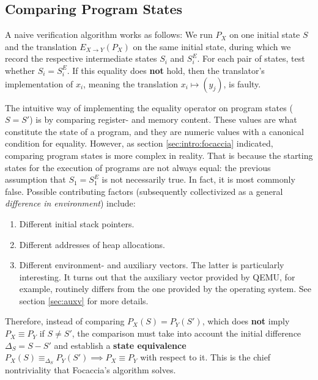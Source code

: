 \subsection{Comparing Program States}\label{sec:impl:comparison}

A naive verification algorithm works as follows: We run $P_X$ on one initial state $S$ and the translation $E_{X
\rightarrow Y}(P_X)$ on the same initial state, during which we record the respective intermediate states $S_i$ and
$S^E_i$. For each pair of states, test whether $S_i = S^E_i$. If this equality does \textbf{not} hold, then the
translator's implementation of $x_i$, meaning the translation $x_i \mapsto (y_j)$, is faulty.

The intuitive way of implementing the equality operator on program states ($S = S'$) is by comparing register- and
memory content. These values are what constitute the state of a program, and they are numeric values with a canonical
condition for equality. However, as section \ref{sec:intro:focaccia} indicated, comparing program states is more complex
in reality. That is because the starting states for the execution of programs are not always equal: the previous
assumption that $S_1 = S^E_1$ is not necessarily true. In fact, it is most commonly false. Possible contributing factors
(subsequently collectivized as a general \textit{difference in environment}) include:

\begin{enumerate}
    \item Different initial stack pointers.
    \item Different addresses of heap allocations.
    \item Different environment- and auxiliary vectors. The latter is particularly interesting. It turns out that
        the auxiliary vector provided by QEMU, for example, routinely differs from the one provided by the operating
        system. See section \ref{sec:auxv} for more details.
\end{enumerate}

Therefore, instead of comparing $P_X(S) = P_Y(S')$, which does \textbf{not} imply $P_X \equiv P_Y$ if $S \neq S'$, the
comparison must take into account the initial difference $\Delta_S = S - S'$ and establish a \textbf{state equivalence}
$P_X(S) \equiv_{\Delta_S} P_Y(S') \implies P_X \equiv P_Y$ with respect to it. This is the chief nontriviality that
Focaccia's algorithm solves.

